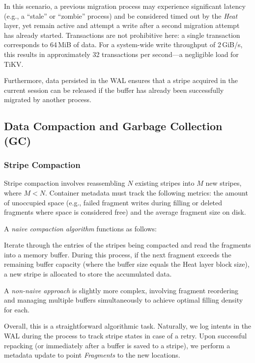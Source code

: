 \documentclass[a4paper,12pt]{article}
\begin{document}
    In this scenario, a previous migration process may experience significant latency (e.g., a \enquote{stale} or \enquote{zombie} process)
    and be considered timed out by the \textit{Heat} layer, yet remain active and attempt a write after a second migration attempt has already started.
    Transactions are not prohibitive here: a single transaction corresponds to 64\,MiB of data. For a system-wide write throughput of 2\,GiB/s,
    this results in approximately 32 transactions per second—a negligible load for TiKV.

    Furthermore, data persisted in the WAL ensures that a stripe acquired in the current session can be released if the buffer has already been successfully migrated by another process.

    \subsection{Data Compaction and Garbage Collection (GC)}

    \subsubsection{Stripe Compaction}

    Stripe compaction involves reassembling $N$ existing stripes into $M$ new stripes, where $M < N$.
    Container metadata must track the following metrics: the amount of unoccupied space (e.g., failed fragment writes during filling or deleted fragments where space is considered free) and the average fragment size on disk.

    \smallskip
    A \textit{naive compaction algorithm} functions as follows:
    \smallskip

    Iterate through the entries of the stripes being compacted and read the fragments into a memory buffer. During this process, if the next fragment exceeds the remaining buffer capacity (where the buffer size equals the Heat layer block size), a new stripe is allocated to store the accumulated data.

    A \textit{non-naive approach} is slightly more complex, involving fragment reordering and managing multiple buffers simultaneously to achieve optimal filling density for each.

    Overall, this is a straightforward algorithmic task. Naturally, we log intents in the WAL during the process to track stripe states in case of a retry. Upon successful repacking (or immediately after a buffer is saved to a stripe), we perform a metadata update to point \textit{Fragments} to the new locations.
\end{document}
